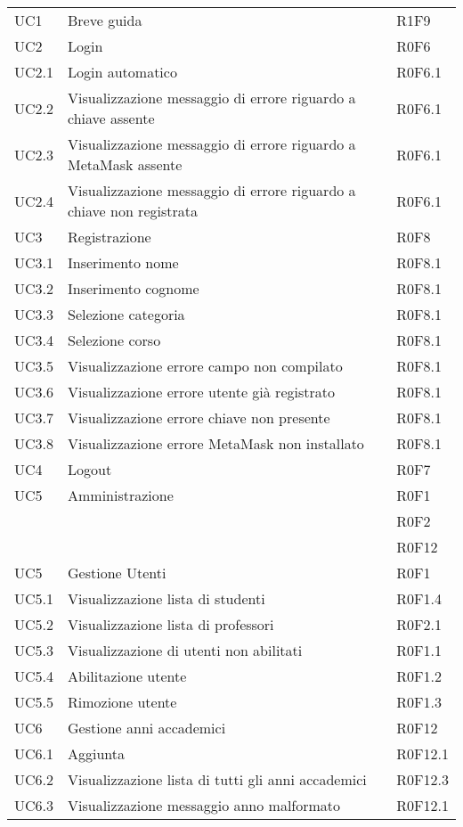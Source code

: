\documentclass[AnalisiDeiRequisiti.tex]{subfiles}
\begin{document}
\begin{longtable}[H]{p{2cm}p{5cm}p{5cm}}
	UC1 & Breve guida & R1F9 \\  
	UC2 & Login & R0F6 \\  
	UC2.1 & Login automatico & R0F6.1 \\  
	UC2.2 & Visualizzazione messaggio di errore riguardo a chiave assente & R0F6.1 \\  
	UC2.3 & Visualizzazione messaggio di errore riguardo a MetaMask assente & R0F6.1 \\  
	UC2.4 & Visualizzazione messaggio di errore riguardo a chiave non registrata & R0F6.1 \\  
	UC3 & Registrazione & R0F8 \\
	UC3.1 & Inserimento nome & R0F8.1 \\  
	UC3.2 & Inserimento cognome & R0F8.1 \\  
	UC3.3 & Selezione categoria & R0F8.1 \\  
	UC3.4 & Selezione corso & R0F8.1 \\  
	UC3.5 & Visualizzazione errore campo non compilato & R0F8.1 \\  
	UC3.6 & Visualizzazione errore utente già registrato & R0F8.1 \\  
	UC3.7 & Visualizzazione errore chiave non presente & R0F8.1 \\  
	UC3.8 & Visualizzazione errore MetaMask non installato & R0F8.1 \\  
	UC4 & Logout & R0F7 \\  
	UC5 & Amministrazione &  R0F1 \\ 
	& & R0F2 \\
	& & R0F12\\  
	UC5 & Gestione Utenti &  R0F1 \\  
	UC5.1 & Visualizzazione lista di studenti & R0F1.4 \\  
	UC5.2 & Visualizzazione lista di professori &  R0F2.1\\  
	UC5.3 & Visualizzazione di utenti non abilitati & R0F1.1 \\  
	UC5.4 & Abilitazione utente & R0F1.2 \\    
	UC5.5 & Rimozione utente & R0F1.3 \\  
	UC6 & Gestione anni accademici &  R0F12\\  
	UC6.1 & Aggiunta \citGloss{anno accademico} &  R0F12.1 \\  
	UC6.2 & Visualizzazione lista di tutti gli anni accademici & R0F12.3 \\   
	UC6.3 & Visualizzazione messaggio anno malformato & R0F12.1 \\  

\end{longtable}
\end{document}

